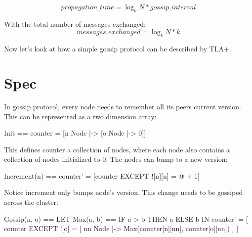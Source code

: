 \documentclass{report}
\begin{document}
\begin{equation} 
    propagation\_time = \log_k N * gossip\_interval
\end{equation}

With the total number of messages exchanged: 
\begin{equation} 
    messages\_exchanged = \log_k N * k
\end{equation}

Now let's look at how a simple gossip protocol can be described by TLA+.

\section{Spec}

In gossip protocol, every node needs to remember all its peers current
version. This can be represented as a two dimension array:\newline
\begin{tla}
    Init == counter = [n \in Node |-> [o \in Node |-> 0]] 
\end{tla}
\begin{tlatex}
\end{tlatex}
\newline

This defines counter a collection of nodes, where each node also contains a
collection of nodes initialized to 0. The nodes can bump to a new version:\newline
\begin{tla}
    Increment(n) == counter' = [counter EXCEPT ![n][n] = @ + 1]
\end{tla}
\begin{tlatex}
\end{tlatex}
\newline

Notice increment only bumps node's version. This change needs to be gossiped 
across the cluster:\newline
\begin{tla}
Gossip(n, o) ==                  
    LET Max(a, b) == IF a > b THEN a ELSE b 
    IN counter' = [
        counter EXCEPT ![o] = [
            nn \in Node |->            
                Max(counter[n][nn], counter[o][nn])
            ] 
    ]
\end{tla}
\begin{tlatex}
%
\@x{\@s{16.4} \.{\IN} counter \.{'} \.{=} [}%
\@x{\@s{40.89} counter {\EXCEPT} {\bang} [ o ] \.{=} [}%
%
%
\@x{\@s{57.29} ]}%
\@x{\@s{16.4} ]}%
\end{tlatex}
\newline
\end{document}

